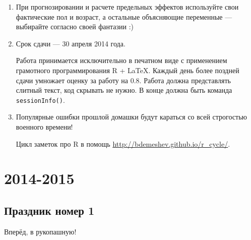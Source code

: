 \documentclass[12pt, a4paper]{article}
\begin{document}
\begin{enumerate}
\item При прогнозировании и расчете предельных эффектов используйте свои фактические пол и возраст, а остальные объясняющие переменные — выбирайте согласно своей фантазии :)

\item Срок сдачи — 30 апреля 2014 года.

Работа принимается исключительно в печатном виде с применением грамотного программирования R + \LaTeX. Каждый день более поздней сдачи умножает оценку за работу на $0.8$.  Работа должна представлять слитный текст, код скрывать не нужно. В конце должна быть команда \verb|sessionInfo()|.

\item Популярные ошибки прошлой домашки будут караться со всей строгостью военного времени!

Цикл заметок про R в помощь \url{http://bdemeshev.github.io/r_cycle/}.

\end{enumerate}


\section{2014-2015}

\subsection{Праздник номер 1}

{\Large Вперёд, в рукопашную! }
\end{document}

